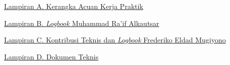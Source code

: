 \noindent\hyperref[app:tor]{Lampiran A. Kerangka Acuan Kerja Praktik}\dotfill\pageref{app:tor}\par
\noindent\hyperref[app:logbook]{Lampiran B. \textit{Logbook} Muhammad Ra'if Alkautsar}\dotfill\pageref{app:logbook}\par
\noindent\hyperref[app:frederiko]{Lampiran C. Kontribusi Teknis dan \textit{Logbook} Frederiko Eldad Mugiyono}\dotfill\pageref{app:frederiko}\par
\noindent\hyperref[app:dokumen-teknis]{Lampiran D. Dokumen Teknis}\dotfill\pageref{app:dokumen-teknis}\par
